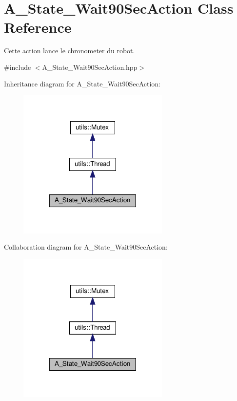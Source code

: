 \hypertarget{classA__State__Wait90SecAction}{}\section{A\+\_\+\+State\+\_\+\+Wait90\+Sec\+Action Class Reference}
\label{classA__State__Wait90SecAction}


Cette action lance le chronometer du robot.  




{\ttfamily \#include $<$A\+\_\+\+State\+\_\+\+Wait90\+Sec\+Action.\+hpp$>$}



Inheritance diagram for A\+\_\+\+State\+\_\+\+Wait90\+Sec\+Action\+:
\nopagebreak
\begin{figure}[H]
\begin{center}
\leavevmode
\includegraphics[width=213pt]{classA__State__Wait90SecAction__inherit__graph}
\end{center}
\end{figure}


Collaboration diagram for A\+\_\+\+State\+\_\+\+Wait90\+Sec\+Action\+:
\nopagebreak
\begin{figure}[H]
\begin{center}
\leavevmode
\includegraphics[width=213pt]{classA__State__Wait90SecAction__coll__graph}
\end{center}
\end{figure}
